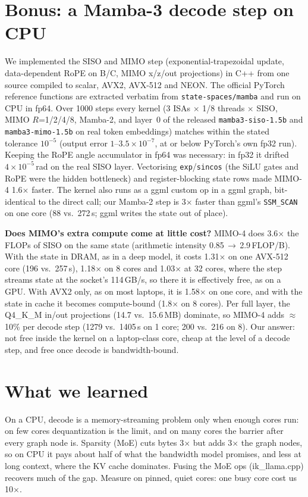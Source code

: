 \documentclass[10pt,twocolumn]{article}
\begin{document}
\section{Bonus: a Mamba-3 decode step on CPU}
We implemented the SISO and MIMO step (exponential-trapezoidal update, data-dependent RoPE on B/C, MIMO x/z/out projections) in
C++ from one source compiled to scalar, AVX2, AVX-512 and NEON. The official PyTorch reference functions are extracted verbatim from
\texttt{state-spaces/mamba} and run on CPU in fp64. Over 1000 steps every kernel (3 ISAs $\times$ 1/8 threads $\times$ SISO, MIMO
$R$=1/2/4/8, Mamba-2, and layer~0 of the released \texttt{mamba3-siso-1.5b} and \texttt{mamba3-mimo-1.5b} on real token embeddings)
matches within the stated tolerance $10^{-5}$ (output error $1$--$3.5\times10^{-7}$, at or below PyTorch's own fp32 run). Keeping the
RoPE angle accumulator in fp64 was necessary: in fp32 it drifted $4\times10^{-5}$\,rad on the real SISO layer. Vectorising
\texttt{exp}/\texttt{sincos} (the SiLU gates and RoPE were the hidden bottleneck) and register-blocking state rows made MIMO-4 1.6$\times$
faster. The kernel also runs as a ggml custom op in a ggml graph, bit-identical to the direct call; our Mamba-2 step is 3$\times$ faster
than ggml's \texttt{SSM\_SCAN} on one core (88 vs.\ 272\,\textmu s; ggml writes the state out of place).

\textbf{Does MIMO's extra compute come at little cost?} MIMO-4 does 3.6$\times$ the FLOPs of SISO on the same state (arithmetic
intensity 0.85\,$\to$\,2.9\,FLOP/B). With the state in DRAM, as in a deep model, it costs 1.31$\times$ on one AVX-512 core (196 vs.\
257\,\textmu s), 1.18$\times$ on 8 cores and 1.03$\times$ at 32 cores, where the step streams state at the socket's 114\,GB/s, so there
it is effectively free, as on a GPU. With AVX2 only, as on most laptops, it is 1.58$\times$ on one core, and with the state in cache it
becomes compute-bound (1.8$\times$ on 8 cores). Per full layer, the Q4\_K\_M in/out projections (14.7 vs.\ 15.6\,MB) dominate, so
MIMO-4 adds $\approx$10\% per decode step (1279 vs.\ 1405\,\textmu s on 1 core; 200 vs.\ 216 on 8). Our answer: not free inside the
kernel on a laptop-class core, cheap at the level of a decode step, and free once decode is bandwidth-bound.

\section{What we learned}
On a CPU, decode is a memory-streaming problem only when enough cores run: on few cores dequantization is the limit, and on many
cores the barrier after every graph node is. Sparsity (MoE) cuts bytes 3$\times$ but adds 3$\times$ the graph nodes, so on CPU it
pays about half of what the bandwidth model promises, and less at long context, where the KV cache dominates. Fusing the MoE ops
(ik\_llama.cpp) recovers much of the gap. Measure on pinned, quiet cores: one busy core cost us 10$\times$.
\end{document}
